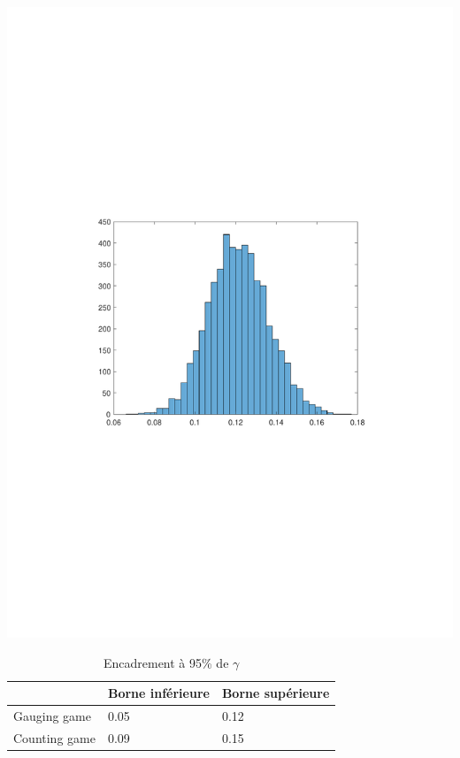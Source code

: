 \documentclass{scrreprt}
\begin{document}
  

\begin{center}
\includegraphics[trim = 3cm 9cm 3cm 9cm, clip]{bootstrap.pdf}
\label{fig4}
\end{center}

\begin{table}
	\begin{tabular}{|p{4cm}|p{4.5cm}|p{4.5cm}|}
		\hline
 & Borne inférieure & Borne supérieure  \tabularnewline
		\hline
Gauging game & 0.05 &  0.12  \tabularnewline
		\hline
Counting game & 0.09 & 0.15 \tabularnewline
		\hline
	\end{tabular}
	\caption{Encadrement à 95\% de $\gamma$}
\end{table}

\newpage

 
\end{document}

